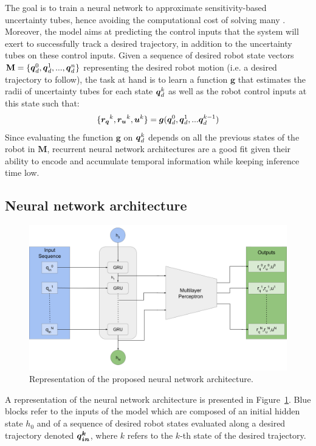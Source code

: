 The goal is to train a neural network to approximate sensitivity-based uncertainty tubes, hence avoiding the computational cost of solving many . 
Moreover, the model aims at predicting the control inputs that the system will exert to successfully track a desired trajectory, in addition to the uncertainty tubes on these control inputs. 
Given a sequence of desired robot state vectors $\textbf{M} = \{\boldsymbol{q}_{d}^0, \boldsymbol{q}_{d}^1, ..., \boldsymbol{q}_{d}^n\}$ representing the desired robot motion (i.e. a desired trajectory to follow), the task at hand is to learn a function $\boldsymbol{g}$ that estimates the radii of uncertainty tubes for each state $\boldsymbol{q}_{d}^k$ as well as the robot control inputs at this state such that:
\begin{equation}\label{eq:prob_statement}
\{\boldsymbol{r_q}^{k}, \boldsymbol{r_u}^{k},\boldsymbol{u}^{k}\} = \boldsymbol{g}(\boldsymbol{q}_{d}^0, \boldsymbol{q}_{d}^1, ... \boldsymbol{q}_{d}^{k-1})
\end{equation}
Since evaluating the function $\boldsymbol{g}$ on $\boldsymbol{q}_{d}^k$ depends on all the previous states of the robot in $\textbf{M}$, recurrent neural network architectures are a good fit given their ability to encode and accumulate temporal information while keeping inference time low.

\subsection{Neural network architecture}\label{sec:architecture}

\begin{figure} [t]
    \centering
    \includegraphics[width=0.8\linewidth]{figures/learning_quadrotor/SensiNN_GRU.png}%
    \caption{Representation of the proposed neural network architecture.
    }%
    \label{fig: NN}%
\end{figure}

A representation of the neural network architecture is presented in Figure~\ref{fig: NN}.
Blue blocks refer to the inputs of the model which are composed of an initial hidden state $h_{0}$ and of a sequence of desired robot states evaluated along a desired trajectory denoted $\boldsymbol{\boldsymbol{q}_{in}^k}$, where $k$ refers to the $k$-th state of the desired trajectory. 

